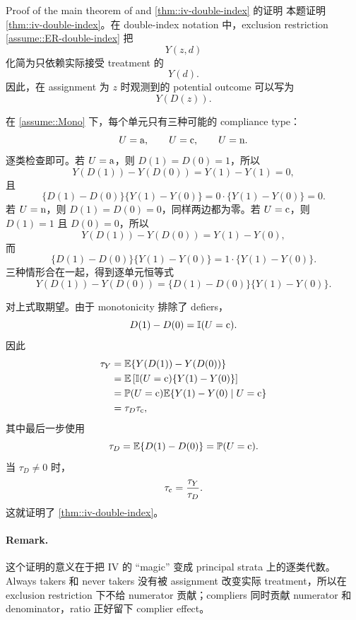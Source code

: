 \begin{exercisesolution}{Proof of the main theorem of \citet{imbens1994identification} and \citet{angrist1996identification}}{\cref{thm::iv-double-index} 的证明}
本题证明 \cref{thm::iv-double-index}。在 double-index notation 中，exclusion restriction \cref{assume::ER-double-index} 把
\[
Y(z,d)
\]
化简为只依赖实际接受 treatment 的
\[
Y(d).
\]
因此，在 assignment 为 $z$ 时观测到的 potential outcome 可以写为
\[
Y(D(z)).
\]

在 \cref{assume::Mono} 下，每个单元只有三种可能的 compliance type：
\[
U=\textup{a},\qquad U=\textup{c},\qquad U=\textup{n}.
\]
逐类检查即可。若 $U=\textup{a}$，则 $D(1)=D(0)=1$，所以
\[
Y(D(1))-Y(D(0))=Y(1)-Y(1)=0,
\]
且
\[
\{D(1)-D(0)\}\{Y(1)-Y(0)\}=0\cdot\{Y(1)-Y(0)\}=0.
\]
若 $U=\textup{n}$，则 $D(1)=D(0)=0$，同样两边都为零。若 $U=\textup{c}$，则 $D(1)=1$ 且 $D(0)=0$，所以
\[
Y(D(1))-Y(D(0))=Y(1)-Y(0),
\]
而
\[
\{D(1)-D(0)\}\{Y(1)-Y(0)\}=1\cdot\{Y(1)-Y(0)\}.
\]
三种情形合在一起，得到逐单元恒等式
\[
Y(D(1))-Y(D(0))
=
\{D(1)-D(0)\}\{Y(1)-Y(0)\}.
\]

对上式取期望。由于 monotonicity 排除了 defiers，
\[
D(1)-D(0)=\mathbb{I}(U=\textup{c}).
\]
因此
\begin{align*}
\tau_Y
&=
\mathbb{E}\{Y(D(1))-Y(D(0))\}\\
&=
\mathbb{E}\left[\mathbb{I}(U=\textup{c})\{Y(1)-Y(0)\}\right]\\
&=
\mathbb{P}(U=\textup{c})\mathbb{E}\{Y(1)-Y(0)\mid U=\textup{c}\}\\
&=
\tau_D\tau_{\textup{c}},
\end{align*}
其中最后一步使用
\[
\tau_D=\mathbb{E}\{D(1)-D(0)\}=\mathbb{P}(U=\textup{c}).
\]
当 $\tau_D\neq0$ 时，
\[
\tau_{\textup{c}}=\frac{\tau_Y}{\tau_D}.
\]
这就证明了 \cref{thm::iv-double-index}。

\paragraph{Remark.}
这个证明的意义在于把 IV 的 ``magic'' 变成 principal strata 上的逐类代数。Always takers 和 never takers 没有被 assignment 改变实际 treatment，所以在 exclusion restriction 下不给 numerator 贡献；compliers 同时贡献 numerator 和 denominator，ratio 正好留下 complier effect。
\end{exercisesolution}

